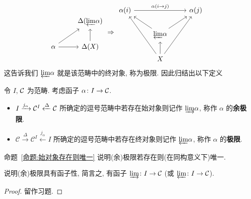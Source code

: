 \[\begin{tikzcd}
	& {\Delta(\prolim \alpha)} \\
	\alpha & {\Delta(X)}
	\arrow[from=2-1, to=1-2]
	\arrow[from=2-1, to=2-2]
	\arrow[from=2-2, to=1-2]
\end{tikzcd} \Rightarrow \begin{tikzcd}
	{\alpha(i)} && {\alpha(j)} \\
	& {\prolim \alpha} \\
	& X
	\arrow["{{\alpha(i\to j)}}", from=1-1, to=1-3]
	\arrow[from=2-2, to=1-1]
	\arrow[from=2-2, to=1-3]
	\arrow[from=3-2, to=1-1]
	\arrow[from=3-2, to=1-3]
	\arrow[from=3-2, to=2-2]
\end{tikzcd}\]
这告诉我们 $\underleftarrow{\lim} \alpha$ 就是该范畴中的终对象, 称为极限. 因此归结出以下定义
\begin{definition}
令 $I$, $\cal{C}$ 为范畴. 考虑函子 $\alpha  \colon I \to \cal{C}$.
    \begin{itemize}
        \item $I \xrightarrow{j_{\alpha}}\mathcal{C}^I \xleftarrow{\Delta} \cal{C}$ 所确定的逗号范畴中若存在始对象则记作 $\underrightarrow{\lim} \alpha$, 称作 $\alpha$ 的\textbf{余极限}.
        \item $\mathcal{C} \xrightarrow{\Delta}\mathcal{C}^I \xleftarrow{j_{\alpha}} I$ 所确定的逗号范畴中若存在终对象则记作 $\underleftarrow{\lim} \alpha$, 称作 $\alpha$ 的\textbf{极限}.
    \end{itemize}
\end{definition}
命题~\ref{命题:始对象存在则唯一} 说明(余)极限若存在则(在同构意义下)唯一.
\begin{lemma}[函子性]
    说明(余)极限具有函子性, 简言之, 有函子 $\underrightarrow{\lim} \colon I \to \cal{C}$ (或 $\underleftarrow{\lim} \colon I \to \cal{C}$).
\end{lemma}
\begin{proof}
    留作习题.
\end{proof}
